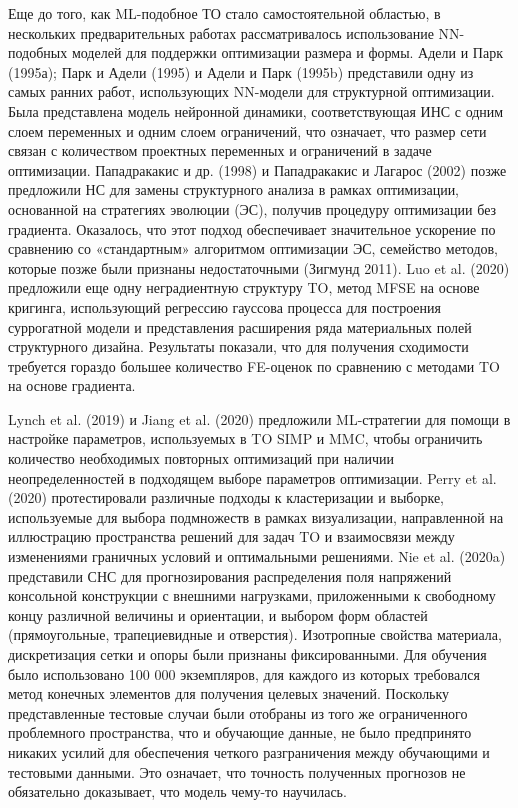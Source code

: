 Еще до того, как ML-подобное ТО стало самостоятельной областью, в нескольких предварительных работах рассматривалось использование NN-подобных моделей для поддержки оптимизации размера и формы. Адели и Парк (1995а); Парк и Адели (1995) и Адели и Парк (1995b) представили одну из самых ранних работ, использующих NN-модели для структурной оптимизации. Была представлена модель нейронной динамики, соответствующая ИНС с одним слоем переменных и одним слоем ограничений, что означает, что размер сети связан с количеством проектных переменных и ограничений в задаче оптимизации. Пападракакис и др. (1998) и Пападракакис и Лагарос (2002) позже предложили НС для замены структурного анализа в рамках оптимизации, основанной на стратегиях эволюции (ЭС), получив процедуру оптимизации без градиента. Оказалось, что этот подход обеспечивает значительное ускорение по сравнению со «стандартным» алгоритмом оптимизации ЭС, семейство методов, которые позже были признаны недостаточными (Зигмунд 2011). Luo et al. (2020) предложили еще одну неградиентную структуру TO, метод MFSE на основе кригинга, использующий регрессию гауссова процесса для построения суррогатной модели и представления расширения ряда материальных полей структурного дизайна. Результаты показали, что для получения сходимости требуется гораздо большее количество FE-оценок по сравнению с методами TO на основе градиента.

Lynch et al. (2019) и Jiang et al. (2020) предложили ML-стратегии для помощи в настройке параметров, используемых в TO SIMP и MMC, чтобы ограничить количество необходимых повторных оптимизаций при наличии неопределенностей в подходящем выборе параметров оптимизации. Perry et al. (2020) протестировали различные подходы к кластеризации и выборке, используемые для выбора подмножеств в рамках визуализации, направленной на иллюстрацию пространства решений для задач TO и взаимосвязи между изменениями граничных условий и оптимальными решениями. Nie et al. (2020a) представили СНС для прогнозирования распределения поля напряжений консольной конструкции с внешними нагрузками, приложенными к свободному концу различной величины и ориентации, и выбором форм областей (прямоугольные, трапециевидные и отверстия). Изотропные свойства материала, дискретизация сетки и опоры были признаны фиксированными. Для обучения было использовано 100 000 экземпляров, для каждого из которых требовался метод конечных элементов для получения целевых значений. Поскольку представленные тестовые случаи были отобраны из того же ограниченного проблемного пространства, что и обучающие данные, не было предпринято никаких усилий для обеспечения четкого разграничения между обучающими и тестовыми данными. Это означает, что точность полученных прогнозов не обязательно доказывает, что модель чему-то научилась.

